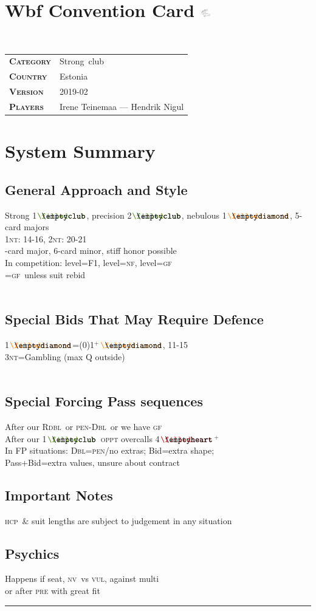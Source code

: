 \documentclass{article}
\newcommand\coloredsuitsymbol[3]{\ensuremath{\mathrel{\raisebox{-0.3pt}{{\color{#1}#2}\llap{#3}}}}}
\newcommand\suitsymbol[3]{\coloredsuitsymbol{#1}{#2}{#3}}%
\newcommand\C{\suitsymbol{clubcolor}{\filledclub}{\emptyclub}}
\newcommand\D{\suitsymbol{diamondcolor}{\filleddiamond}{\emptydiamond}}
\renewcommand\H{\suitsymbol{heartcolor}{\filledheart}{\emptyheart}}
\newcommand\N{\caps{nt}}
\newcommand\X{\caps{Dbl}}
\newcommand\XX{\caps{Rdbl}}
\newcommand\caps[1]{{\scshape#1}}
\newcommand\hcp{\caps{hcp}}
\newcommand\GF{\caps{gf}}
\newcommand\NF{\caps{nf}}
\newcommand\VUL{\caps{vul}}
\newcommand\NV{\caps{nv}}
\newcommand\more{\ensuremath{^+}}
\newcommand{\smallsection}[1]{\vspace{-1ex}\subsection*{#1}\raggedright}
\newcommand{\thinrule}{\rule{\textwidth}{\arrayrulewidth}}
\newcommand{\myendrule}{\vspace{-1.5ex}\thinrule}
\begin{document}
\begin{minipage}[t]{90mm}
\section*{Wbf Convention Card \includegraphics[width=4mm]{logo.png}}\ \\
\begin{tabular}{p{20mm}p{70mm}}
\textbf{\caps{Category}} & \mbox{\color{spadecolor}Strong club} \\
\textbf{\caps{Country}} & Estonia \\
\textbf{\caps{Version}} & 2019-02\\
\textbf{\caps{Players}} & Irene {Teinemaa} \caps{} --- Hendrik {Nigul} \caps{} \\
\end{tabular}
\section*{System Summary}
\smallsection{General Approach and Style}
	Strong 1\C, precision 2\C, nebulous 1\D, 5-card majors\\
	1\N: 14-16, 2\N: 20-21\\
	-card major, 6-card minor, stiff honor possible\\
	In competition:  level=F1,  level=\NF,  level=\GF\\
	\sfrac{2}{1}\caps{resp}=\GF\ unless suit rebid\\
	~\\
\smallsection{Special Bids That May Require Defence} 
	1\D=(0)1\more\D, 11-15\\
	3\N=Gambling (max Q outside)\\
	~\\
\smallsection{Special Forcing Pass sequences} 
	After our \XX\ or \caps{pen}-\X\ or we have \GF\\
	After our 1\C\ \caps{oppt} overcalls 4\H \more\\
	In FP situations: \X=\caps{pen}/no extras; Bid=extra shape;\\
	\quad Pass+Bid=extra values, unsure about contract
~\\
\smallsection{Important Notes}
	\hcp\ \& suit lengths are subject to judgement in any situation\\
\smallsection{Psychics} 
	Happens if  seat, \NV\ vs \VUL, against multi\\
	or after \caps{pre} with great fit\\
\myendrule
\end{minipage}
\end{document}
